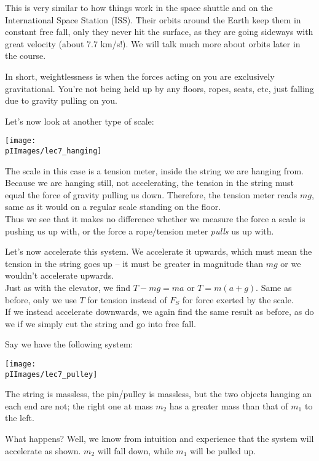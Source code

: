 This is very similar to how things work in the space shuttle and on the International Space Station (ISS). Their orbits around the Earth keep them in constant free fall, only they never hit the surface, as they are going sideways with great velocity (about 7.7 km/s!). We will talk much more about orbits later in the course.

In short, weightlessness is when the forces acting on you are exclusively gravitational. You're not being held up by any floors, ropes, seats, etc, just falling due to gravity pulling on you.

Let's now look at another type of scale:

\begin{center}
\texttt{[image: \\pIImages/lec7\_hanging]}
\end{center}

The scale in this case is a tension meter, inside the string we are hanging from. Because we are hanging still, not accelerating, the tension in the string must equal the force of gravity pulling us down. Therefore, the tension meter reads $m g$, same as it would on a regular scale standing on the floor.\\
Thus we see that it makes no difference whether we measure the force a scale is pushing us up with, or the force a rope/tension meter \emph{pulls} us up with.

Let's now accelerate this system. We accelerate it upwards, which must mean the tension in the string goes up -- it must be greater in magnitude than $m g$ or we wouldn't accelerate upwards.\\
Just as with the elevator, we find $T - m g = m a$ or $T = m(a + g)$. Same as before, only we use $T$ for tension instead of $F_S$ for force exerted by the scale.\\
If we instead accelerate downwards, we again find the same result as before, as do we if we simply cut the string and go into free fall.

Say we have the following system:

\begin{center}
\texttt{[image: \\pIImages/lec7\_pulley]}
\end{center}

The string is massless, the pin/pulley is massless, but the two objects hanging an each end are not; the right one at mass $m_2$ has a greater mass than that of $m_1$ to the left.

What happens? Well, we know from intuition and experience that the system will accelerate as shown. $m_2$ will fall down, while $m_1$ will be pulled up.

